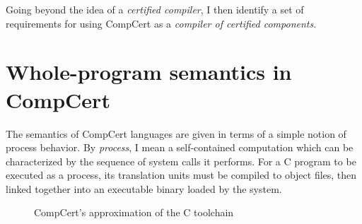 \documentclass[11pt,oneside,draft]{book}
\theoremstyle{definition}
\begin{document}
Going beyond the idea of a
\emph{certified compiler},
I then identify a set of requirements
for using CompCert as a
\emph{compiler of certified components}.

\section{Whole-program semantics in CompCert} \label{sec:sem:closed} %


The semantics of CompCert languages
are given in terms of a simple notion of process behavior.
By \emph{process}, I mean a self-contained computation
which can be characterized by
the sequence of system calls it performs.
For a C program to be executed as a process,
its translation units must be compiled to object files,
then linked together
into an executable binary
loaded by the system.

\begin{figure} %
  \centering
    \caption{CompCert's approximation of the C toolchain}
    \label{fig:process}
\end{figure}
\end{document}
